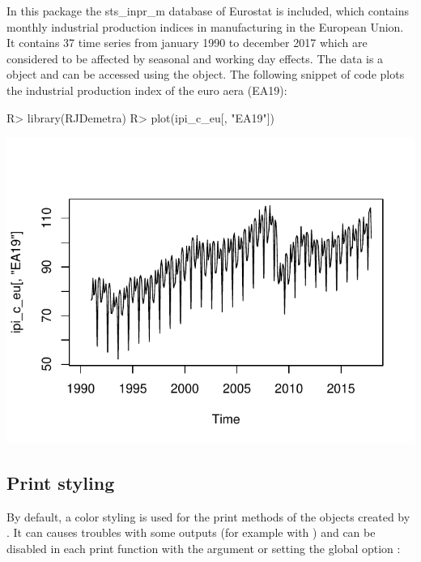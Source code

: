 \documentclass[article]{jss}
\begin{document}
In this package the sts\_inpr\_m database of Eurostat is included, which
contains monthly industrial production indices in manufacturing in the
European Union. It contains 37 time series from january 1990 to december
2017 which are considered to be affected by seasonal and working day
effects. The data is a  object and can be accessed using the
 object. The following snippet of code plots the
industrial production index of the euro aera (EA19):

\begin{CodeChunk}

\begin{CodeInput}
R> library(RJDemetra)
R> plot(ipi_c_eu[, "EA19"])
\end{CodeInput}


\begin{center}\includegraphics{img/img-basic_raw_data_plot-1} \end{center}

\end{CodeChunk}

\hypertarget{print-styling}{%
\subsection{Print styling}\label{print-styling}}

By default, a color styling is used for the print methods of the objects
created by . It can causes troubles with some outputs
(for example with  \citep{rmarkdown}) and can be disabled
in each print function with the argument
 or setting the global option
:
\end{document}
